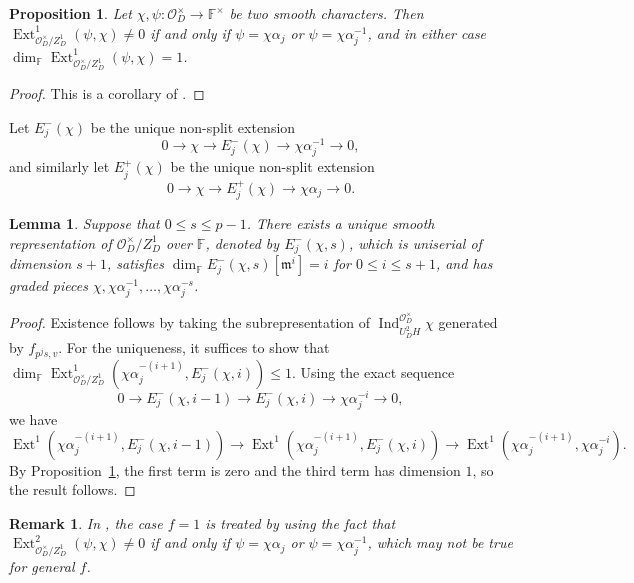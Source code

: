 \documentclass{article}
\newtheorem{proposition}[definition]{Proposition}
\newtheorem{lemma}[definition]{Lemma}
\newtheorem{remark}[definition]{Remark}
\numberwithin{equation}{section}
\DeclareMathOperator{\Ind}{Ind}
\DeclareMathOperator{\Ext}{Ext}
\newcommand{\Indu}[3]{\Ind_{#1}^{#2}{#3}}
\newcommand{\fm}{\mathfrak{m}}
\newcommand{\bF}{\mathbb{F}}
\newcommand{\cO}{\mathcal{O}}
\begin{document}
\begin{proposition}\label{ext1-of-character}
    Let $\chi,\psi:\cO_D^\times\to \bF^\times$ be two smooth characters. 
    Then $\Ext^1_{\cO_D^\times/Z_D^1}(\psi,\chi)\ne 0$ if and only if $\psi=\chi\alpha_j$ or $\psi=\chi\alpha_j^{-1}$, 
    and in either case $\dim_{\bF}\Ext^1_{\cO_D^\times/Z_D^1}(\psi,\chi)=1$. 
\end{proposition}

\begin{proof}
    This is a corollary of \cite[Cor.~2.11]{HW24a}.
\end{proof}

Let $E_j^-(\chi)$ be the unique non-split extension 
\begin{equation}
    0\to\chi\to E_j^-(\chi)\to\chi\alpha_j^{-1}\to 0,
\end{equation}
and similarly let $E^+_j(\chi)$ be the unique non-split extension 
\begin{equation}
    0\to\chi\to E_j^+(\chi)\to\chi\alpha_j\to 0.
\end{equation}

\begin{lemma}
    Suppose that $0\leq s\leq p-1$. There exists a unique smooth representation of $\cO_D^\times/Z_D^1$ over $\bF$, 
    denoted by $E_j^-(\chi,s)$, which is uniserial of dimension $s+1$, satisfies $\dim_{\bF} E^-_j(\chi,s)[\fm^i]=i$ for $0\leq i\leq s+1$, and has graded pieces $\chi,\chi\alpha_j^{-1},\ldots,\chi\alpha_j^{-s}$. 
\end{lemma}

\begin{proof}
    Existence follows by taking the subrepresentation of $\Indu{U_D^2H}{\cO_D^\times}{\chi}$ generated by $f_{p^js,v}$. 
    For the uniqueness, it suffices to show that $\dim_{\bF}\Ext^1_{\cO_D^\times/Z_D^1}(\chi\alpha_j^{-(i+1)},E_j^-(\chi,i))\leq 1$. 
    Using the exact sequence 
    $$0\to E^-_j(\chi,i-1)\to E^-_j(\chi,i)\to \chi\alpha_j^{-i}\to 0,$$
    we have 
    $$\Ext^1(\chi\alpha_j^{-(i+1)},E^-_j(\chi,i-1))\to \Ext^{1}(\chi\alpha_j^{-(i+1)},E^-_j(\chi,i))\to\Ext^1(\chi\alpha_j^{-(i+1)},\chi\alpha_j^{-i}).$$
    By Proposition~\ref{ext1-of-character}, the first term is zero and the third term has dimension $1$, so the result follows. 
\end{proof}

\begin{remark}
    \begin{sloppypar}
    In \cite[Lemma~2.3]{HW24b}, the case $f=1$ is treated by using the fact that 
    $\Ext^2_{\cO_D^\times/Z_D^1}(\psi,\chi)\ne 0$ if and only if $\psi=\chi\alpha_j$ or $\psi=\chi\alpha_j^{-1}$, 
    which may not be true for general $f$. 
    \end{sloppypar}
\end{remark}
\end{document}
